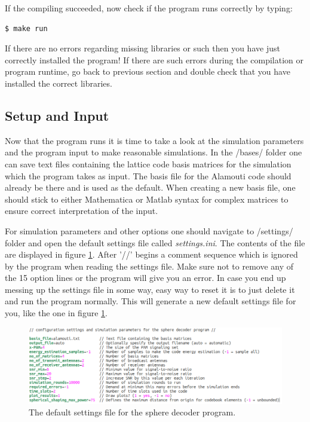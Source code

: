 \documentclass[english,12pt,a4paper,pdftex,sci,utf8]{aaltothesis}
\begin{document}
\noindent If the compiling succeeded, now check if the program runs correctly by typing:
\begin{verbatim}
$ make run
\end{verbatim}
If there are no errors regarding missing libraries or such then you have just correctly installed the program! If there are such errors during the compilation or program runtime, go back to previous section and double check that you have installed the correct libraries. 

\subsection{Setup and Input}

Now that the program runs it is time to take a look at the simulation parameters and the program input to make reasonable simulations. In the /bases/ folder one can save text files containing the lattice code basis matrices for the simulation which the program takes as input. The basis file for the Alamouti code should already be there and is used as the default. When creating a new basis file, one should stick to either Mathematica or Matlab syntax for complex matrices to ensure correct interpretation of the input. 
\par For simulation parameters and other options one should navigate to /settings/ folder and open the default settings file called \textit{settings.ini}. The contents of the file are displayed in figure \ref{fig:settings}. After '//' begins a comment sequence which is ignored by the program when reading the settings file. Make sure not to remove any of the 15 option lines or the program will give you an error. In case you end up messing up the settings file in some way, easy way to reset it is to just delete it and run the program normally. This will generate a new default settings file for you, like the one in figure \ref{fig:settings}.

\begin{figure}[htb]
\begin{center}
  \includegraphics[width=\linewidth]{settings}
  \caption{The default settings file for the sphere decoder program.}
  \label{fig:settings}
\end{center}
\end{figure}
\end{document}
